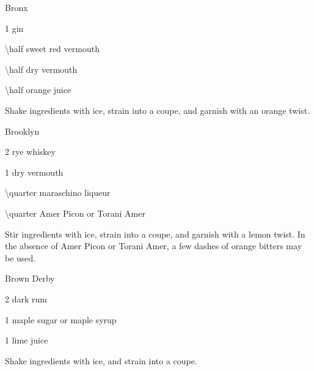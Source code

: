 \begin{Cocktail}{Bronx}
	\begin{Ingredients}
	\item \SI{1}{\oz} gin
	\item \SI{\half}{\oz} sweet red vermouth
	\item \SI{\half}{\oz} dry vermouth
	\item \SI{\half}{\oz} orange juice
	\end{Ingredients}
	
	\begin{Instructions}
	Shake ingredients with ice, strain into a coupe, and garnish with an orange twist.
	\end{Instructions}
\end{Cocktail}

\begin{Cocktail}{Brooklyn}
	\begin{Ingredients}
	\item \SI{2}{\oz} rye whiskey
	\item \SI{1}{\oz} dry vermouth
	\item \SI{\quarter}{\oz} maraschino liqueur
	\item \SI{\quarter}{\oz} Amer Picon or Torani Amer
	\end{Ingredients}
	
	\begin{Instructions}
	Stir ingredients with ice, strain into a coupe, and garnish with a lemon twist.  In the absence of Amer Picon or Torani Amer, a few dashes of orange bitters may be used.
	\end{Instructions}
\end{Cocktail}

\begin{Cocktail}{Brown Derby}
	\begin{Ingredients}
	\item \SI{2}{\oz} dark rum
	\item \SI{1}{\tsp} maple sugar or maple syrup
	\item \SI{1}{\oz} lime juice
	\end{Ingredients}
	
	\begin{Instructions}
	Shake ingredients with ice, and strain into a coupe.
	\end{Instructions}
\end{Cocktail}

